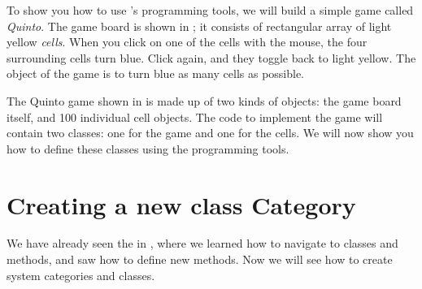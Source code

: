 \documentclass[a4paper,10pt,twoside]{book}
\begin{document}
To show you how to use \squeak's programming tools, we will build a simple game called \emph{Quinto}.  The game board is shown in ; it consists of rectangular array of light yellow \emph{cells}.  When you click on one of the cells with the mouse, the four surrounding cells turn blue.  Click again, and they toggle back to light yellow.  The object of the game is to turn blue as many cells as possible.

The Quinto game shown in  is made up of two kinds of objects: the game board itself, and 100 individual cell objects.  The \squeak code to implement the game will contain two classes: one for the game and one for the cells.
We will now show you how to define these classes using the \squeak programming tools.

\section{Creating a new class Category}

We have already seen the  in , where we learned how to navigate to classes and methods, and saw how to define new methods.
Now we will see how to create system categories and classes.

\end{document}
